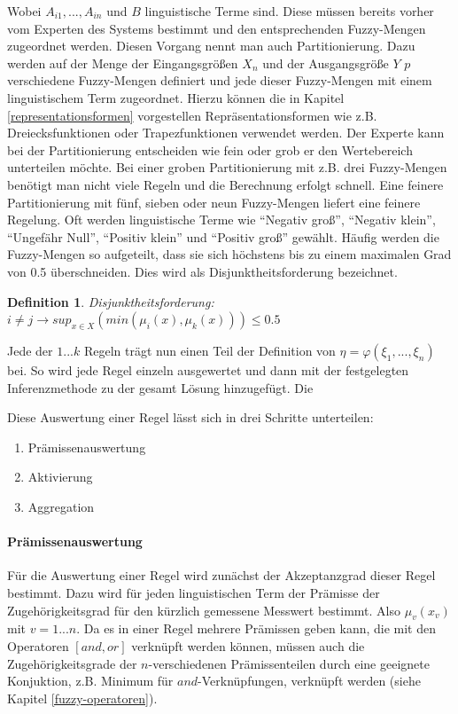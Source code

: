 \documentclass[12pt,a4paper,bibliography=totocnumbered,listof=totocnumbered]{scrartcl}
\theoremstyle{Umgebung}
\begin{document}
Wobei $A_{i1},...,A_{in}$ und $B$ linguistische Terme sind. Diese müssen bereits vorher vom Experten des Systems bestimmt und den entsprechenden Fuzzy-Mengen zugeordnet werden. Diesen Vorgang nennt man auch Partitionierung. Dazu werden auf der Menge der Eingangsgrößen $X_n$ und der Ausgangsgröße $Y$ $p$ verschiedene Fuzzy-Mengen definiert und jede dieser Fuzzy-Mengen mit einem linguistischem Term zugeordnet. Hierzu können die in Kapitel \ref{representationsformen} vorgestellen Repräsentationsformen wie z.B. Dreiecksfunktionen oder Trapezfunktionen verwendet werden. Der Experte kann bei der Partitionierung entscheiden wie fein oder grob er den Wertebereich unterteilen möchte. Bei einer groben Partitionierung mit z.B. drei Fuzzy-Mengen benötigt man nicht viele Regeln und die Berechnung erfolgt schnell. Eine feinere Partitionierung mit fünf, sieben oder neun Fuzzy-Mengen liefert eine feinere Regelung. Oft werden linguistische Terme wie \enquote{Negativ groß}, \enquote{Negativ klein}, \enquote{Ungefähr Null}, \enquote{Positiv klein} und \enquote{Positiv groß} gewählt. Häufig werden die Fuzzy-Mengen so aufgeteilt, dass sie sich höchstens bis zu einem maximalen Grad von 0.5 überschneiden. Dies wird als Disjunktheitsforderung bezeichnet.

\newtheorem{disjunktheitsforderung}{Definition}
\begin{disjunktheitsforderung}
	Disjunktheitsforderung: $i \neq j \rightarrow sup_{x \in X} (min(\mu_i(x), \mu_k(x))) \leq 0.5$
\end{disjunktheitsforderung}

Jede der $1...k$ Regeln trägt nun einen Teil der Definition von $\eta = \varphi(\xi_1,..., \xi_n)$ bei. So wird jede Regel einzeln ausgewertet und dann mit der festgelegten Inferenzmethode zu der gesamt Lösung hinzugefügt. Die

Diese Auswertung einer Regel lässt sich in drei Schritte unterteilen:

\begin{enumerate} 
	\item Prämissenauswertung
	\item Aktivierung
	\item Aggregation
\end{enumerate}

\paragraph{Prämissenauswertung}

Für die Auswertung einer Regel wird zunächst der Akzeptanzgrad dieser Regel bestimmt. Dazu wird für jeden linguistischen Term der Prämisse der Zugehörigkeitsgrad für den kürzlich gemessene Messwert bestimmt. Also $\mu_v (x_v)$ mit $v = 1...n$. Da es in einer Regel mehrere Prämissen geben kann, die mit den Operatoren $\left[and, or\right]$ verknüpft werden können, müssen auch die Zugehörigkeitsgrade der $n$-verschiedenen Prämissenteilen durch eine geeignete Konjuktion, z.B. Minimum für $and$-Verknüpfungen, verknüpft werden (siehe Kapitel \ref{fuzzy-operatoren}).
\end{document}
